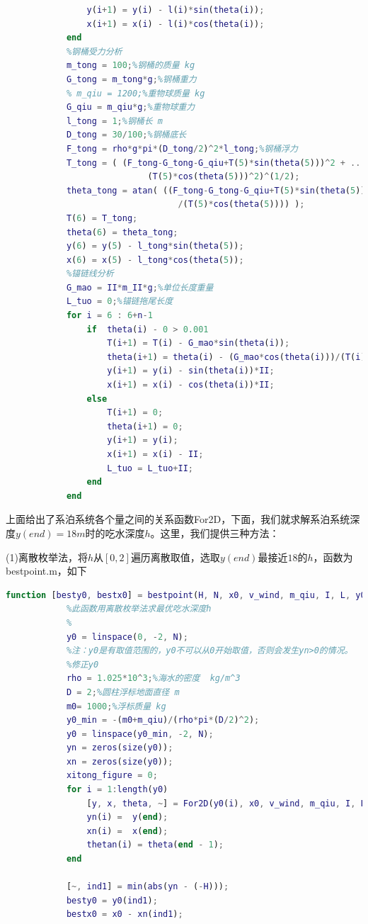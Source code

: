 \begin{lstlisting}[language = Matlab]
                %钢管i的坐标（xi,yi）
                y(i+1) = y(i) - l(i)*sin(theta(i));
                x(i+1) = x(i) - l(i)*cos(theta(i));
            end
            %钢桶受力分析
            m_tong = 100;%钢桶的质量 kg
            G_tong = m_tong*g;%钢桶重力
            % m_qiu = 1200;%重物球质量 kg
            G_qiu = m_qiu*g;%重物球重力
            l_tong = 1;%钢桶长 m
            D_tong = 30/100;%钢桶底长
            F_tong = rho*g*pi*(D_tong/2)^2*l_tong;%钢桶浮力
            T_tong = ( (F_tong-G_tong-G_qiu+T(5)*sin(theta(5)))^2 + ...
                            (T(5)*cos(theta(5)))^2)^(1/2);
            theta_tong = atan( ((F_tong-G_tong-G_qiu+T(5)*sin(theta(5)))...
                                  /(T(5)*cos(theta(5)))) );
            T(6) = T_tong;
            theta(6) = theta_tong;
            y(6) = y(5) - l_tong*sin(theta(5));
            x(6) = x(5) - l_tong*cos(theta(5));
            %锚链线分析
            G_mao = II*m_II*g;%单位长度重量
            L_tuo = 0;%锚链拖尾长度
            for i = 6 : 6+n-1
                if  theta(i) - 0 > 0.001
                    T(i+1) = T(i) - G_mao*sin(theta(i));
                    theta(i+1) = theta(i) - (G_mao*cos(theta(i)))/(T(i)-G_mao*sin(theta(i)));
                    y(i+1) = y(i) - sin(theta(i))*II;
                    x(i+1) = x(i) - cos(theta(i))*II;
                else
                    T(i+1) = 0;
                    theta(i+1) = 0;
                    y(i+1) = y(i);
                    x(i+1) = x(i) - II;
                    L_tuo = L_tuo+II;
                end
            end
            \end{lstlisting}
            \par
            上面给出了系泊系统各个量之间的关系函数For2D，下面，我们就求解系泊系统深度$y(end)=18m$时的吃水深度$h$。这里，我们提供三种方法：
            \par
            (1)离散枚举法，将$h$从$[0,2]$遍历离散取值，选取$y(end)$最接近$18$的$h$，函数为bestpoint.m，如下
            \begin{lstlisting}[language = Matlab]
            function [besty0, bestx0] = bestpoint(H, N, x0, v_wind, m_qiu, I, L, y0_yn_figure)
            %此函数用离散枚举法求最优吃水深度h
            %
            y0 = linspace(0, -2, N);
            %注：y0是有取值范围的，y0不可以从0开始取值，否则会发生yn>0的情况。
            %修正y0
            rho = 1.025*10^3;%海水的密度  kg/m^3
            D = 2;%圆柱浮标地面直径 m
            m0= 1000;%浮标质量 kg
            y0_min = -(m0+m_qiu)/(rho*pi*(D/2)^2);
            y0 = linspace(y0_min, -2, N);
            yn = zeros(size(y0));
            xn = zeros(size(y0));
            xitong_figure = 0;
            for i = 1:length(y0)
                [y, x, theta, ~] = For2D(y0(i), x0, v_wind, m_qiu, I, L, xitong_figure);
                yn(i) =  y(end);
                xn(i) =  x(end);
                thetan(i) = theta(end - 1);
            end

            [~, ind1] = min(abs(yn - (-H)));
            besty0 = y0(ind1);
            bestx0 = x0 - xn(ind1);
            \end{lstlisting}
